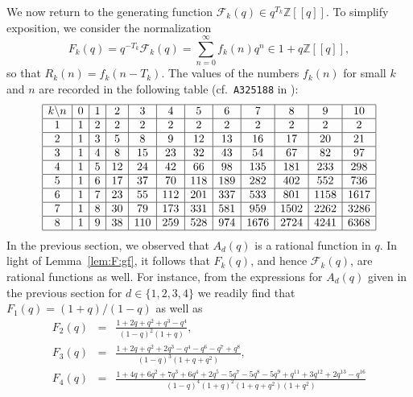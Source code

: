 \documentclass[11pt]{article}
\theoremstyle{plain}
\theoremstyle{definition}
\newcommand{\tmtt}[1]{\texttt{#1}}
\begin{document}
We now return to the generating function $\mathcal{F}_k (q) \in q^{T_k}
\mathbb{Z} [[q]]$. To simplify exposition, we consider the normalization
\begin{equation*}
  F_k (q) = q^{- T_k} \mathcal{F}_k (q) = \sum_{n = 0}^{\infty} f_k (n) q^n
   \in 1 + q\mathbb{Z} [[q]],
\end{equation*}
so that $R_k (n) = f_k (n - T_k)$. The values of the numbers $f_k (n)$ for
small $k$ and $n$ are recorded in the following table (cf.~{\tmtt{A325188}} in
\cite{sloane-oeis}):
\begin{equation*}
  \begin{array}{|c|c|c|c|c|c|c|c|c|c|c|c|}
     \hline
     k\backslash n & 0 & 1 & 2 & 3 & 4 & 5 & 6 & 7 & 8 & 9 & 10\\
     \hline
     1 & 1 & 2 & 2 & 2 & 2 & 2 & 2 & 2 & 2 & 2 & 2\\
     \hline
     2 & 1 & 3 & 5 & 8 & 9 & 12 & 13 & 16 & 17 & 20 & 21\\
     \hline
     3 & 1 & 4 & 8 & 15 & 23 & 32 & 43 & 54 & 67 & 82 & 97\\
     \hline
     4 & 1 & 5 & 12 & 24 & 42 & 66 & 98 & 135 & 181 & 233 & 298\\
     \hline
     5 & 1 & 6 & 17 & 37 & 70 & 118 & 189 & 282 & 402 & 552 & 736\\
     \hline
     6 & 1 & 7 & 23 & 55 & 112 & 201 & 337 & 533 & 801 & 1158 & 1617\\
     \hline
     7 & 1 & 8 & 30 & 79 & 173 & 331 & 581 & 959 & 1502 & 2262 & 3286\\
     \hline
     8 & 1 & 9 & 38 & 110 & 259 & 528 & 974 & 1676 & 2724 & 4241 & 6368\\
     \hline
   \end{array}
\end{equation*}
In the previous section, we observed that $A_d (q)$ is a rational function in
$q$. In light of Lemma~\ref{lem:F:gf}, it follows that $F_k (q)$, and hence
$\mathcal{F}_k (q)$, are rational functions as well. For instance, from the
expressions for $A_d (q)$ given in the previous section for $d \in \{ 1, 2, 3,
4 \}$ we readily find that $F_1 (q) = (1 + q) / (1 - q)$ as well as
\begin{eqnarray*}
  F_2 (q) & = & \frac{1 + 2 q + q^2 + q^3 - q^4}{(1 - q)^2 (1 + q)},\\
  F_3 (q) & = & \frac{1 + 2 q + q^2 + 2 q^3 - q^4 - q^6 - q^7 + q^8}{(1 - q)^3
  (1 + q + q^2)},\\
  F_4 (q) & = & \frac{1 + 4 q + 6 q^2 + 7 q^3 + 6 q^4 + 2 q^5 - 5 q^7 - 5 q^8
  - 5 q^9 + q^{11} + 3 q^{12} + 2 q^{13} - q^{16}}{(1 - q)^4 (1 + q)^2 (1 + q
  + q^2) (1 + q^2)}
\end{eqnarray*}
\end{document}
